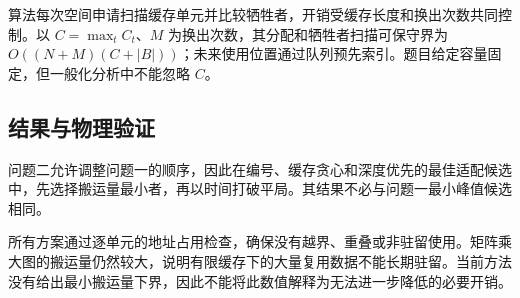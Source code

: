 算法每次空间申请扫描缓存单元并比较牺牲者，开销受缓存长度和换出次数共同控制。以 $C=\max_t C_t$、$M$ 为换出次数，其分配和牺牲者扫描可保守界为 $O((N+M)(C+|B|))$；未来使用位置通过队列预先索引。题目给定容量固定，但一般化分析中不能忽略 $C$。

\subsection{结果与物理验证}
问题二允许调整问题一的顺序，因此在编号、缓存贪心和深度优先的最佳适配候选中，先选择搬运量最小者，再以时间打破平局。其结果不必与问题一最小峰值候选相同。
\begin{table}[H]\centering\caption{缓存优先方案的额外搬运量与执行时间}\small
\end{table}
所有方案通过逐单元的地址占用检查，确保没有越界、重叠或非驻留使用。矩阵乘大图的搬运量仍然较大，说明有限缓存下的大量复用数据不能长期驻留。当前方法没有给出最小搬运量下界，因此不能将此数值解释为无法进一步降低的必要开销。

